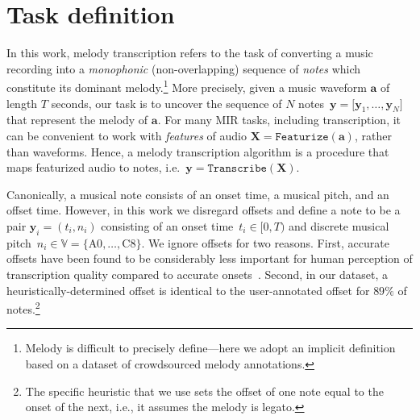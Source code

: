 \section{Task definition}
\label{sec:task}

In this work, melody transcription refers to the task of converting a music recording into a \emph{monophonic} (non-overlapping) sequence of \emph{notes} which constitute its dominant melody.\footnote{Melody is difficult to precisely define---here we adopt an implicit definition based on a dataset of crowdsourced melody annotations.} 
More precisely, given a music waveform $\bm{a}$ of length $T$ seconds, our task is to 
uncover 
the sequence of $N$ notes~${\bm{y} = [\bm{y}_1,\dots,\bm{y}_N}]$ that represent the melody of $\bm{a}$.  For many MIR tasks, including transcription, it can be convenient to work with \emph{features} of audio ${\bm{X} = \texttt{Featurize}(\bm{a})}$, rather than waveforms. 
Hence, a melody transcription algorithm is a procedure that maps featurized audio to notes, i.e.~${\bm{y} = \texttt{Transcribe}(\bm{X})}$. 


Canonically, a musical note consists of an onset time, a musical pitch, and an offset time. 
However, in this work  
we disregard offsets and define a note to be a pair $\bm{y}_i = (t_i,n_i)$ consisting of an onset time~${t_i \in [0,T)}$ and discrete musical pitch~${n_i \in \mathbb{V} = \{\text{A0}, \ldots, \text{C8}\}}$.
We ignore offsets for 
two reasons. 
First, accurate offsets have been found to be considerably less important for human perception of transcription quality compared to accurate onsets~\cite{ycart2020investigating}. 
Second, in our dataset,
a heuristically-determined offset is identical to the user-annotated offset for $89\%$ of notes.\footnote{The specific heuristic that we use sets the offset of one note equal to the onset of the next, i.e., it assumes the melody is legato.}

